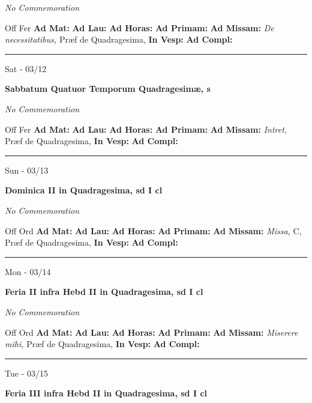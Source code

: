 \documentclass[letterpaper, 10pt]{article}
\begin{document}
\textit{No Commemoration}\begin{justify}
Off Fer
\textbf{Ad Mat: }
\textbf{Ad Lau: }
\textbf{Ad Horas: }
\textbf{Ad Primam: }
\textbf{Ad Missam:} \textit{De necessitatibus, } Præf de Quadragesima, 
\textbf{In Vesp: }
\textbf{Ad Compl: }\end{justify}



\hrule
\begin{center}
Sat - 03/12
\end{center}\textbf{ \large Sabbatum Quatuor Temporum Quadragesimæ, \textnormal{\normalsize s}}

\textit{No Commemoration}\begin{justify}
Off Fer
\textbf{Ad Mat: }
\textbf{Ad Lau: }
\textbf{Ad Horas: }
\textbf{Ad Primam: }
\textbf{Ad Missam:} \textit{Intret, } Præf de Quadragesima, 
\textbf{In Vesp: }
\textbf{Ad Compl: }\end{justify}



\hrule
\begin{center}
Sun - 03/13
\end{center}\textbf{ \large Dominica II in Quadragesima, \textnormal{\normalsize sd I cl}}

\textit{No Commemoration}\begin{justify}
Off Ord
\textbf{Ad Mat: }
\textbf{Ad Lau: }
\textbf{Ad Horas: }
\textbf{Ad Primam: }
\textbf{Ad Missam:} \textit{Missa, } C, Præf de Quadragesima, 
\textbf{In Vesp: }
\textbf{Ad Compl: }\end{justify}



\hrule
\begin{center}
Mon - 03/14
\end{center}\textbf{ \large Feria II infra Hebd II in Quadragesima, \textnormal{\normalsize sd I cl}}

\textit{No Commemoration}\begin{justify}
Off Ord
\textbf{Ad Mat: }
\textbf{Ad Lau: }
\textbf{Ad Horas: }
\textbf{Ad Primam: }
\textbf{Ad Missam:} \textit{Miserere mihi, } Præf de Quadragesima, 
\textbf{In Vesp: }
\textbf{Ad Compl: }\end{justify}



\hrule
\begin{center}
Tue - 03/15
\end{center}\textbf{ \large Feria III infra Hebd II in Quadragesima, \textnormal{\normalsize sd I cl}}
\end{document}
